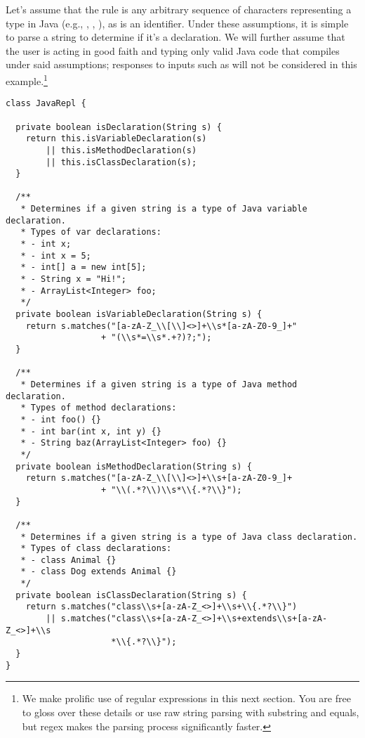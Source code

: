 Let's assume that the  rule is any arbitrary sequence of characters representing a type in Java (e.g., , , ), as is an identifier. 
Under these assumptions, it is simple to parse a string to determine if it's a declaration. 
We will further assume that the user is acting in good faith and typing only valid Java code that compiles under said assumptions; responses to inputs such as  will not be considered in this example.\footnote{We make prolific use of regular expressions in this next section. You are free to gloss over these details or use raw string parsing with substring and equals, but regex makes the parsing process significantly faster.}

\begin{lstlisting}[language=MyJava]
class JavaRepl {

  private boolean isDeclaration(String s) {
    return this.isVariableDeclaration(s)
        || this.isMethodDeclaration(s)
        || this.isClassDeclaration(s);
  }

  /**
   * Determines if a given string is a type of Java variable declaration.
   * Types of var declarations:
   * - int x;
   * - int x = 5;
   * - int[] a = new int[5];
   * - String x = "Hi!";
   * - ArrayList<Integer> foo;
   */
  private boolean isVariableDeclaration(String s) {
    return s.matches("[a-zA-Z_\\[\\]<>]+\\s*[a-zA-Z0-9_]+"
                   + "(\\s*=\\s*.+?)?;");
  }

  /**
   * Determines if a given string is a type of Java method declaration.
   * Types of method declarations:
   * - int foo() {}
   * - int bar(int x, int y) {}
   * - String baz(ArrayList<Integer> foo) {}
   */
  private boolean isMethodDeclaration(String s) {
    return s.matches("[a-zA-Z_\\[\\]<>]+\\s+[a-zA-Z0-9_]+
                   + "\\(.*?\\)\\s*\\{.*?\\}");
  }

  /**
   * Determines if a given string is a type of Java class declaration.
   * Types of class declarations:
   * - class Animal {}
   * - class Dog extends Animal {}
   */
  private boolean isClassDeclaration(String s) {
    return s.matches("class\\s+[a-zA-Z_<>]+\\s+\\{.*?\\}") 
        || s.matches("class\\s+[a-zA-Z_<>]+\\s+extends\\s+[a-zA-Z_<>]+\\s
                     *\\{.*?\\}");
  }
}
\end{lstlisting}

